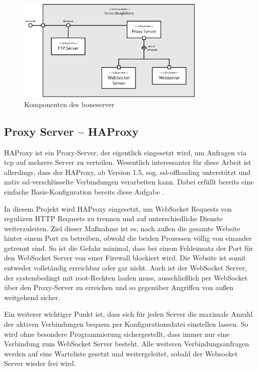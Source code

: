 \begin{figure}[ht]
  \centering
  \includegraphics[width = 0.8\textwidth]{documentation/images/componentsServer.eps}
  \caption{Komponenten des boneserver}
  \label{fig:componentsServer}
\end{figure}


\subsection{Proxy Server -- HAProxy}
\label{subsec:HAProxy}
HAProxy ist ein Proxy-Server, der eigentlich eingesetzt wird, um Anfragen via \gls{tcp} auf mehrere Server zu verteilen. Wesentlich interessanter für diese Arbeit ist allerdings, dass der HAProxy, ab Version 1.5, sog. \gls{ssl-offloading} unterstützt und nativ \gls{ssl}-verschlüsselte Verbindungen verarbeiten kann. Dabei erfüllt bereits eine einfache Basis-Konfiguration bereits diese Aufgabe \cite{kuehnast2014}.

In diesem Projekt wird HAProxy eingesetzt, um WebSocket Requests von regulären HTTP Requests zu trennen und auf unterschiedliche Dienste weiterzuleiten. Ziel dieser Maßnahme ist es, nach außen die gesamte Website hinter einem Port zu betreiben, obwohl die beiden Prozessen völlig von einander getrennt sind. So ist die Gefahr minimal, dass bei einem Feldeinsatz der Port für den WebSocket Server von einer Firewall blockiert wird. Die Website ist somit entweder vollständig erreichbar oder gar nicht. Auch ist der WebSocket Server, der systembedingt mit root-Rechten laufen muss, ausschließlich per WebSocket über den Proxy-Server zu erreichen und so gegenüber Angriffen von außen weitgehend sicher.

Ein weiterer wichtiger Punkt ist, dass sich für jeden Server die maximale Anzahl der aktiven Verbindungen bequem per Konfigurationsdatei einstellen lassen. So wird ohne besondere Programmierung sichergestellt, dass immer nur eine Verbindung zum WebSocket Server besteht. Alle weiteren Verbindungsanfragen werden auf eine Warteliste gesetzt und weitergeleitet, sobald der Websocket Server wieder frei wird.\\

